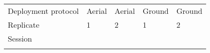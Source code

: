 \documentclass[version=last,
    paper=a4,                               %
    10pt,                                   %
    dvipsnames,
    oneside,                              %
    headings=openany,                       %
    open=any,
    BCOR=7mm,                               %
    DIV=15,     %
]{scrbook}
\begin{document}
\begin{longtable}[c]{@{}lllll@{}}
\toprule\addlinespace
\begin{minipage}[t]{0.17\columnwidth}\raggedright
Deployment protocol
\end{minipage} & \begin{minipage}[t]{0.17\columnwidth}\raggedright
Aerial
\end{minipage} & \begin{minipage}[t]{0.17\columnwidth}\raggedright
Aerial
\end{minipage} & \begin{minipage}[t]{0.17\columnwidth}\raggedright
Ground
\end{minipage} & \begin{minipage}[t]{0.17\columnwidth}\raggedright
Ground
\end{minipage}
\\\addlinespace
\begin{minipage}[t]{0.17\columnwidth}\raggedright
Replicate
\end{minipage} & \begin{minipage}[t]{0.17\columnwidth}\raggedright
1
\end{minipage} & \begin{minipage}[t]{0.17\columnwidth}\raggedright
2
\end{minipage} & \begin{minipage}[t]{0.17\columnwidth}\raggedright
1
\end{minipage} & \begin{minipage}[t]{0.17\columnwidth}\raggedright
2
\end{minipage}
\\\addlinespace
\begin{minipage}[t]{0.17\columnwidth}\raggedright
Session
\end{minipage} & \begin{minipage}[t]{0.17\columnwidth}\raggedright
~
\end{minipage} & \begin{minipage}[t]{0.17\columnwidth}\raggedright
~
\end{minipage} & \begin{minipage}[t]{0.17\columnwidth}\raggedright
~
\end{minipage} & \begin{minipage}[t]{0.17\columnwidth}\raggedright
~
\end{minipage}
\\\addlinespace
\begin{minipage}[t]{0.17\columnwidth}\raggedright

\end{minipage}
\end{longtable}
\end{document}
